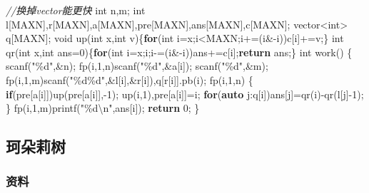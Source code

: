 \documentclass[
]{article}
\newenvironment{Shaded}{}{}
\newcommand{\CommentTok}[1]{\textcolor[rgb]{0.38,0.63,0.69}{\textit{#1}}}
\newcommand{\ControlFlowTok}[1]{\textcolor[rgb]{0.00,0.44,0.13}{\textbf{#1}}}
\newcommand{\DataTypeTok}[1]{\textcolor[rgb]{0.56,0.13,0.00}{#1}}
\newcommand{\DecValTok}[1]{\textcolor[rgb]{0.25,0.63,0.44}{#1}}
\newcommand{\KeywordTok}[1]{\textcolor[rgb]{0.00,0.44,0.13}{\textbf{#1}}}
\newcommand{\NormalTok}[1]{#1}
\newcommand{\SpecialCharTok}[1]{\textcolor[rgb]{0.25,0.44,0.63}{#1}}
\newcommand{\StringTok}[1]{\textcolor[rgb]{0.25,0.44,0.63}{#1}}
\begin{document}
\begin{Shaded}
\begin{Highlighting}[]
\CommentTok{//换掉vector能更快}
\DataTypeTok{int}\NormalTok{ n,m;}
\DataTypeTok{int}\NormalTok{ l[MAXN],r[MAXN],a[MAXN],pre[MAXN],ans[MAXN],c[MAXN];}
\NormalTok{vector\textless{}}\DataTypeTok{int}\NormalTok{\textgreater{} q[MAXN];}
\DataTypeTok{void}\NormalTok{ up(}\DataTypeTok{int}\NormalTok{ x,}\DataTypeTok{int}\NormalTok{ v)\{}\ControlFlowTok{for}\NormalTok{(}\DataTypeTok{int}\NormalTok{ i=x;i\textless{}MAXN;i+=(i\&{-}i))c[i]+=v;\}}
\DataTypeTok{int}\NormalTok{ qr(}\DataTypeTok{int}\NormalTok{ x,}\DataTypeTok{int}\NormalTok{ ans=}\DecValTok{0}\NormalTok{)\{}\ControlFlowTok{for}\NormalTok{(}\DataTypeTok{int}\NormalTok{ i=x;i;i{-}=(i\&{-}i))ans+=c[i];}\ControlFlowTok{return}\NormalTok{ ans;\}}
\DataTypeTok{int}\NormalTok{ work()}
\NormalTok{\{}
\NormalTok{    scanf(}\StringTok{"}\SpecialCharTok{\%d}\StringTok{"}\NormalTok{,\&n);}
\NormalTok{    fp(i,}\DecValTok{1}\NormalTok{,n)scanf(}\StringTok{"}\SpecialCharTok{\%d}\StringTok{"}\NormalTok{,\&a[i]);}
\NormalTok{    scanf(}\StringTok{"}\SpecialCharTok{\%d}\StringTok{"}\NormalTok{,\&m);}
\NormalTok{    fp(i,}\DecValTok{1}\NormalTok{,m)scanf(}\StringTok{"}\SpecialCharTok{\%d\%d}\StringTok{"}\NormalTok{,\&l[i],\&r[i]),q[r[i]].pb(i);}
\NormalTok{    fp(i,}\DecValTok{1}\NormalTok{,n)}
\NormalTok{    \{}
        \ControlFlowTok{if}\NormalTok{(pre[a[i]])up(pre[a[i]],{-}}\DecValTok{1}\NormalTok{); up(i,}\DecValTok{1}\NormalTok{),pre[a[i]]=i;}
        \ControlFlowTok{for}\NormalTok{(}\KeywordTok{auto}\NormalTok{ j:q[i])ans[j]=qr(i){-}qr(l[j]{-}}\DecValTok{1}\NormalTok{);}
\NormalTok{    \}}
\NormalTok{    fp(i,}\DecValTok{1}\NormalTok{,m)printf(}\StringTok{"}\SpecialCharTok{\%d\textbackslash{}n}\StringTok{"}\NormalTok{,ans[i]);}
    \ControlFlowTok{return} \DecValTok{0}\NormalTok{;}
\NormalTok{\}}
\end{Highlighting}
\end{Shaded}

\hypertarget{ux73c2ux6735ux8389ux6811}{%
\subsection{珂朵莉树}\label{ux73c2ux6735ux8389ux6811}}

\hypertarget{ux8d44ux6599}{%
\subsubsection{资料}\label{ux8d44ux6599}}
\end{document}
